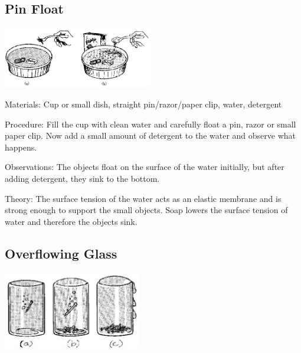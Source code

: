 \begin{multicols}{2}
\subsection{Pin Float}

\begin{center}
\includegraphics[width=0.49\textwidth]{./img/source/pin-float.png}
\end{center}

\begin{description*}
\item[Materials:]{Cup or small dish, straight pin/razor/paper clip, water, detergent}
\item[Procedure:]{Fill the cup with clean water and carefully float a pin, razor or small paper clip. Now add a small amount of detergent to the water and observe what happens.}
\item[Observations:]{The objects float on the surface of the water initially, but after adding detergent, they sink to the bottom.}
\item[Theory:]{The surface tension of the water acts as an elastic membrane and is strong enough to support the small objects. Soap lowers the surface tension of water and therefore the objects sink.}
\end{description*}

\columnbreak

\subsection{Overflowing Glass}

\begin{center}
\includegraphics[width=0.45\textwidth]{./img/source/glass-overflow.jpg}
\end{center}


\end{multicols}
